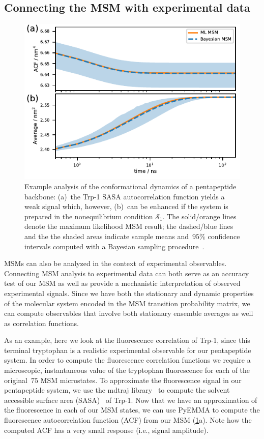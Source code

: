 \documentclass[9pt,tutorial]{livecoms}
\begin{document}
\subsection{Connecting the MSM with experimental data}

\begin{figure}
\includegraphics{figure_7}
\caption{Example analysis of the conformational dynamics of a pentapeptide backbone:
(a)~the Trp-1 SASA autocorrelation function yields a weak signal which, however,
(b)~can be enhanced if the system is prepared in the nonequilibrium condition $\mathcal{S}_1$.
The solid/orange lines denote the maximum likelihood MSM result;
the dashed/blue lines and the the shaded areas indicate sample means and~$95\%$ confidence intervals computed with a Bayesian sampling procedure~\cite{ben-rev-msm}.}
\label{fig:msm-exp-obs}
\end{figure}

MSMs can also be analyzed in the context of experimental observables.
Connecting MSM analysis to experimental data can both serve as an accuracy test of our MSM as well as provide a mechanistic interpretation of observed experimental signals.
Since we have both the stationary and dynamic properties of the molecular system encoded in the MSM transition probability matrix,
we can compute observables that involve both stationary ensemble averages as well as correlation functions.

As an example, here we look at the fluorescence correlation of Trp-1,
since this terminal tryptophan is a realistic experimental observable for our pentapeptide system.
In order to compute the fluorescence correlation functions we require a microscopic,
instantaneous value of the tryptophan fluorescence for each of the original~$75$ MSM microstates.
To approximate the fluorescence signal in our pentapeptide system,
we use the mdtraj library~\cite{mdtraj} to compute the solvent accessible surface area (SASA)~\cite{sasa-calculation} of Trp-1.
Now that we have an approximation of the fluorescence in each of our MSM states,
we can use PyEMMA to compute the fluorescence autocorrelation function (ACF) from our MSM (\ref{fig:msm-exp-obs}a).
Note how the computed ACF has a very small response (i.e., signal amplitude).
\end{document}
